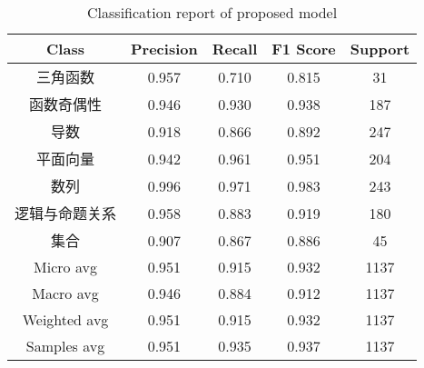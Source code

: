 \begin{table}[htbp!]
    \caption{Classification report of proposed model}\label{tbl:ch2-result-detail}
    \centering
    \begin{tabular}{ccccc}
        \toprule
        Class          & Precision & Recall & F1 Score & Support \\
        \midrule
        三角函数       & 0.957     & 0.710  & 0.815    & 31      \\
        函数奇偶性     & 0.946     & 0.930  & 0.938    & 187     \\
        导数           & 0.918     & 0.866  & 0.892    & 247     \\
        平面向量       & 0.942     & 0.961  & 0.951    & 204     \\
        数列           & 0.996     & 0.971  & 0.983    & 243     \\
        逻辑与命题关系 & 0.958     & 0.883  & 0.919    & 180     \\
        集合           & 0.907     & 0.867  & 0.886    & 45      \\
        \midrule
        Micro avg      & 0.951     & 0.915  & 0.932    & 1137    \\
        Macro avg      & 0.946     & 0.884  & 0.912    & 1137    \\
        Weighted avg   & 0.951     & 0.915  & 0.932    & 1137    \\
        Samples avg    & 0.951     & 0.935  & 0.937    & 1137    \\
        \bottomrule
    \end{tabular}
\end{table}




